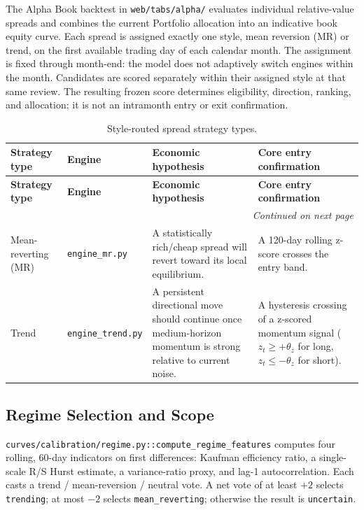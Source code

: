 The Alpha Book backtest in \texttt{web/tabs/alpha/} evaluates individual relative-value
spreads and combines the current Portfolio allocation into an indicative book
equity curve. Each spread is assigned exactly one style, mean reversion (MR) or
trend, on the first available trading day of each calendar month. The assignment
is fixed through month-end: the model does not adaptively switch engines within
the month. Candidates are scored separately within their assigned style at that
same review. The resulting frozen score determines eligibility, direction, ranking,
and allocation; it is not an intramonth entry or exit confirmation.

{\small
\setlength{\LTleft}{0pt}
\setlength{\LTright}{0pt}
\setlength{\tabcolsep}{5pt}
\renewcommand{\arraystretch}{1.15}
\begin{longtable}{p{} p{} p{} p{}}
\caption{Style-routed spread strategy types.}\label{tab:pairs-strategy-types-overleaf} \\
\toprule
\textbf{Strategy type} & \textbf{Engine} & \textbf{Economic hypothesis} & \textbf{Core entry confirmation} \\
\midrule
\endfirsthead
\toprule
\textbf{Strategy type} & \textbf{Engine} & \textbf{Economic hypothesis} & \textbf{Core entry confirmation} \\
\midrule
\endhead
\midrule
\multicolumn{4}{r}{\textit{Continued on next page}} \\
\midrule
\endfoot
\bottomrule
\endlastfoot
Mean-reverting (MR) & \texttt{engine\_mr.py} & A statistically rich/cheap spread will revert toward its local equilibrium. & A 120-day rolling z-score crosses the entry band. \\
Trend & \texttt{engine\_trend.py} & A persistent directional move should continue once medium-horizon momentum is strong relative to current noise. & A hysteresis crossing of a z-scored momentum signal ($z_t \ge +\theta_z$ for long, $z_t \le -\theta_z$ for short). \\
\end{longtable}
}

\subsection{Regime Selection and Scope}
\label{sec:pairs-regime-selection}

\texttt{curves/calibration/regime.py::compute\_regime\_features} computes four rolling,
60-day indicators on first differences: Kaufman efficiency ratio, a single-scale
R/S Hurst estimate, a variance-ratio proxy, and lag-1 autocorrelation. Each casts a
trend / mean-reversion / neutral vote. A net vote of at least $+2$ selects
\texttt{trending}; at most $-2$ selects \texttt{mean\_reverting}; otherwise the result is
\texttt{uncertain}.

